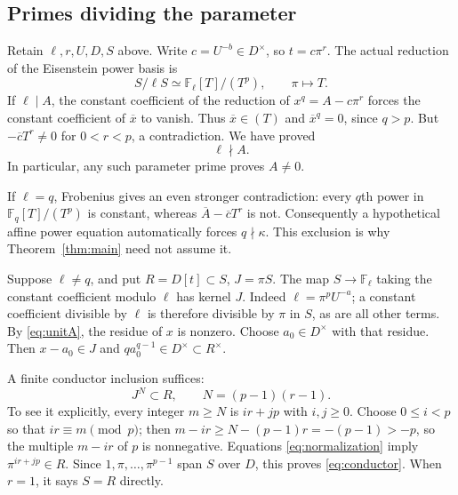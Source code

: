\documentclass[11pt,letterpaper]{article}
\theoremstyle{remark}\newtheorem{remark}[theorem]{Remark}
\newcommand{\F}{\mathbb F}
\begin{document}
\subsection{Primes dividing the parameter}

Retain $\ell,r,U,D,S$ above. Write $c=U^{-b}\in D^\times$, so
$t=c\pi^r$. The actual reduction of the Eisenstein power basis is
\[
            S/\ell S\simeq\F_\ell[T]/(T^p),\qquad\pi\longmapsto T.
\]
If $\ell\mid A$, the constant coefficient of the reduction of
$x^q=A-c\pi^r$ forces the constant coefficient of $\overline x$ to vanish.
Thus $\overline x\in(T)$ and $\overline x^q=0$, since $q>p$.
But $-\overline cT^r\ne0$ for $0<r<p$, a contradiction. We have proved
\begin{equation}\label{eq:unitA}
                              \ell\nmid A.
\end{equation}
In particular, any such parameter prime proves $A\ne0$.

If $\ell=q$, Frobenius gives an even stronger contradiction: every $q$th
power in $\F_q[T]/(T^p)$ is constant, whereas
$\overline A-\overline cT^r$ is not. Consequently a hypothetical affine
power equation automatically forces $q\nmid\kappa$.
This exclusion is why Theorem~\ref{thm:main} need not assume it.

Suppose $\ell\ne q$, and put $R=D[t]\subset S$, $J=\pi S$.
The map $S\to\F_\ell$ taking the constant coefficient modulo $\ell$ has
kernel $J$. Indeed $\ell=\pi^p U^{-a}$; a constant coefficient divisible
by $\ell$ is therefore divisible by $\pi$ in $S$, as are all other terms.
By \eqref{eq:unitA}, the residue of $x$ is nonzero. Choose
$a_0\in D^\times$ with that residue. Then $x-a_0\in J$ and
$q a_0^{q-1}\in D^\times\subset R^\times$.

A finite conductor inclusion suffices:
\begin{equation}\label{eq:conductor}
                    J^N\subset R,\qquad N=(p-1)(r-1).
\end{equation}
To see it explicitly, every integer $m\ge N$ is $ir+jp$ with $i,j\ge0$.
Choose $0\le i<p$ so that $ir\equiv m\pmod p$; then
$m-ir\ge N-(p-1)r=-(p-1)>-p$, so the multiple $m-ir$ of $p$ is nonnegative.
Equations \eqref{eq:normalization} imply $\pi^{ir+jp}\in R$.
Since $1,\pi,\ldots,\pi^{p-1}$ span $S$ over $D$, this proves
\eqref{eq:conductor}. When $r=1$, it says $S=R$ directly.
\end{document}
